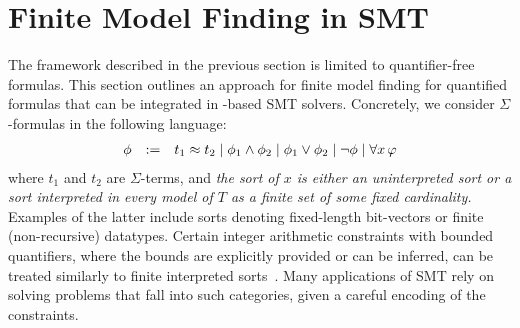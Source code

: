 \documentclass{svjour3}                     %
\begin{document}
\section{Finite Model Finding in SMT}
\label{sec:fmf}

The \dpllts framework described in the previous section is limited to quantifier-free formulas.
This section outlines an approach for finite model finding for quantified formulas
that can be integrated in \dpllts-based SMT solvers.
%
Concretely, we consider $\Sigma$-formulas in the following language:
\[\begin{array}{lcl}
\phi & := & t_1 \approx t_2 \mid \phi_1 \wedge \phi_2 \mid \phi_1 \vee \phi_2 \mid\neg \phi \mid \forall x\, \varphi
\end{array}\]
where $t_1$ and $t_2$ are $\Sigma$-terms, and 
\emph{the sort of $x$ is either an uninterpreted sort or a sort interpreted 
in every model of $T$ as a finite set of some fixed cardinality.}
Examples of the latter include sorts denoting fixed-length bit-vectors
or finite (non-recursive) datatypes.
Certain integer arithmetic constraints with bounded quantifiers,
where the bounds are explicitly provided or can be inferred,
can be treated similarly to finite interpreted sorts~\cite{reynolds2013finite,DBLP:conf/cade/BaumgartnerBW14}.
Many applications of SMT rely on solving problems that fall into such categories, 
given a careful encoding of the constraints.
\end{document}
